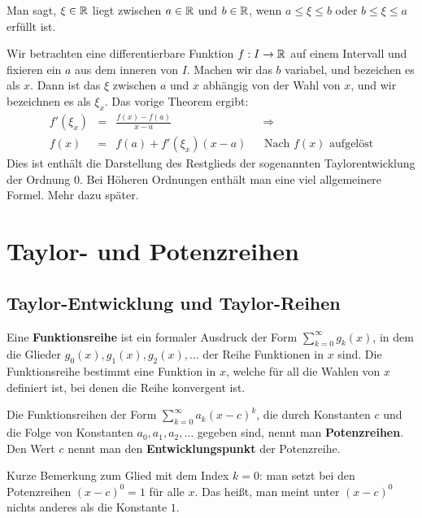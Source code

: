 \begin{defn}
	Man sagt, $\xi \in \mathbb{R}$ liegt zwischen $a \in \mathbb{R}$ und $b \in \mathbb{R}$, wenn $a \le \xi \le b$ oder $b \le \xi \le a$ erfüllt ist. 
\end{defn} 


\begin{bem} 
	Wir betrachten eine differentierbare Funktion $f : I \to \mathbb{R}$ auf einem Intervall und fixieren ein $a$ aus dem inneren von $I$. 
	Machen wir das $b$ variabel, und bezeichen es als $x$. Dann ist das $\xi$ zwischen $a$ und $x$ abhängig von der Wahl von $x$, und wir bezeichnen es als $\xi_x$. Das vorige Theorem ergibt: 
	\[
	\begin{array}{rcl|l}
		f'(\xi_x)  & =& \frac{f(x)-f(a)}{x-a} \hspace{7em} & \ \Rightarrow 
		\\ f(x) & = & f(a) + f'(\xi_x) (x-a) &  \text{ Nach $f(x)$ aufgelöst} 
	\end{array}
	\]
	Dies ist enthält die Darstellung des Restglieds der sogenannten Taylorentwicklung der Ordnung $0$. 
	Bei Höheren Ordnungen enthält man eine viel allgemeinere Formel. Mehr dazu später. 
\end{bem} 

\chapter{Taylor- und Potenzreihen} 

\section{Taylor-Entwicklung und Taylor-Reihen} 

\begin{defn} 
	Eine \textbf{Funktionsreihe} ist ein formaler Ausdruck der Form $\sum_{k=0}^\infty g_k(x)$, in dem die Glieder $g_0(x),g_1(x),g_2(x),\ldots$ der Reihe Funktionen in $x$ sind. Die Funktionsreihe bestimmt eine Funktion in $x$, welche für all die Wahlen von $x$ definiert ist, bei denen die Reihe konvergent ist. 
	
	Die Funktionsreihen der Form $\sum_{k=0}^\infty a_k (x-c)^k$, die durch Konstanten $c$ und die Folge von Konstanten $a_0,a_1,a_2,\ldots$ gegeben sind,  nennt man \textbf{Potenzreihen}. Den Wert $c$ nennt man den \textbf{Entwicklungspunkt} der Potenzreihe. 
	
	Kurze Bemerkung zum Glied mit dem Index $k=0$: man setzt bei den Potenzreihen $(x-c)^0 = 1$ für alle $x$. Das heißt, man meint unter $(x-c)^0$ nichts anderes als die Konstante $1$. 
\end{defn} 

